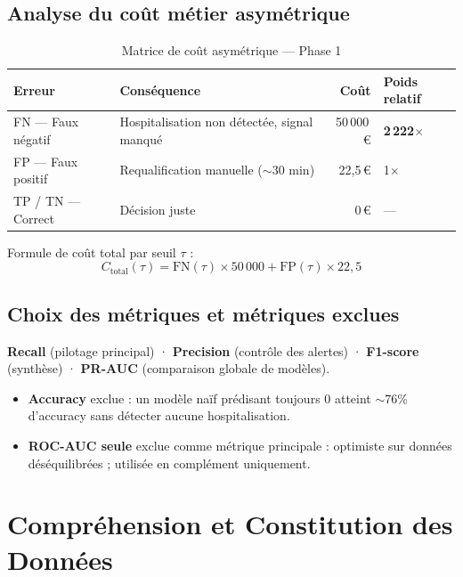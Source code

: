 \documentclass[11pt,a4paper,twoside,openright]{report}
\begin{document}
\section{Analyse du coût métier asymétrique}

\begin{table}[H]
  \centering
  \caption{Matrice de coût asymétrique — Phase 1}
  \label{tab:cout}
  \begin{tabular}{llrl}
    \toprule
    \textbf{Erreur} & \textbf{Conséquence} & \textbf{Coût} & \textbf{Poids relatif} \\
    \midrule
    FN — Faux négatif & Hospitalisation non détectée, signal manqué & 50\,000\,€ & \textbf{2\,222$\times$} \\
    FP — Faux positif & Requalification manuelle ($\sim$30 min) & 22,5\,€ & 1$\times$ \\
    TP / TN — Correct  & Décision juste & 0\,€ & — \\
    \bottomrule
  \end{tabular}
\end{table}

\noindent Formule de coût total par seuil $\tau$ :
\[
  C_{\text{total}}(\tau) = \text{FN}(\tau) \times 50\,000 + \text{FP}(\tau) \times 22{,}5
\]

\section{Choix des métriques et métriques exclues}

\begin{infobox}
\textbf{Recall} (pilotage principal) · \textbf{Precision} (contrôle des alertes) · \textbf{F1-score} (synthèse) · \textbf{PR-AUC} (comparaison globale de modèles).
\end{infobox}

\begin{itemize}
  \item \textbf{Accuracy} exclue : un modèle naïf prédisant toujours 0 atteint $\sim$76\% d'accuracy sans détecter aucune hospitalisation.
  \item \textbf{ROC-AUC seule} exclue comme métrique principale : optimiste sur données déséquilibrées ; utilisée en complément uniquement.
\end{itemize}

\chapter{Compréhension et Constitution des Données}
\label{ch:donnees}
\end{document}
